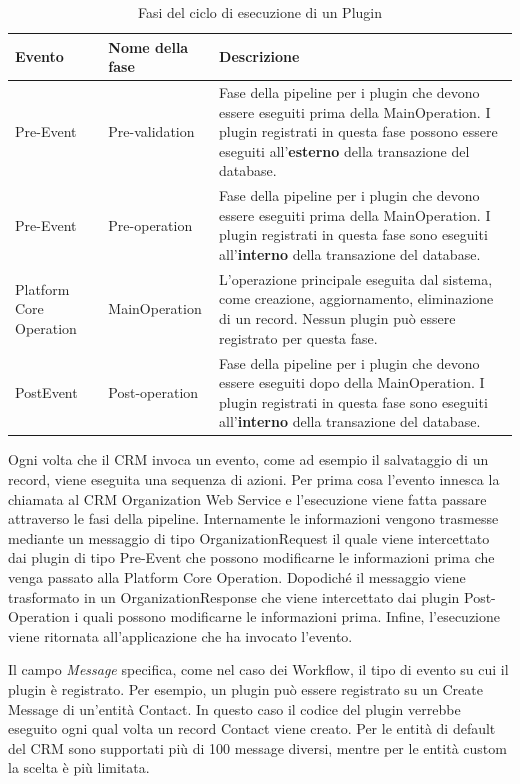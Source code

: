 \begin{table}[ht!]
  \centering
  \begin{tabular}{p{}lp{}}
    \toprule
      \textbf{Evento} & \textbf{Nome della fase} & \textbf{Descrizione} \\
    \midrule
      Pre-Event & Pre-validation &  Fase della pipeline per i plugin che devono essere eseguiti prima della MainOperation. I plugin registrati in questa fase possono essere eseguiti all'\textbf{esterno} della transazione del database. \\
    \midrule
      Pre-Event & Pre-operation & Fase della pipeline per i plugin che devono essere eseguiti prima della MainOperation. I plugin registrati in questa fase sono eseguiti all'\textbf{interno} della transazione del database. \\
    \midrule
      Platform Core Operation & MainOperation &  L'operazione principale eseguita dal sistema, come creazione, aggiornamento, eliminazione di un record. Nessun plugin può essere registrato per questa fase. \\
    \midrule
      PostEvent & Post-operation &  Fase della pipeline per i plugin che devono essere eseguiti dopo della MainOperation. I plugin registrati in questa fase sono eseguiti all'\textbf{interno} della transazione del database. \\
    \bottomrule
  \end{tabular}
  \caption{Fasi del ciclo di esecuzione di un Plugin}
  \label{table:pluginStages}
\end{table}

Ogni volta che il CRM invoca un evento, come ad esempio il salvataggio di un record, viene eseguita una sequenza di azioni.
Per prima cosa l'evento innesca la chiamata al CRM Organization Web Service e l'esecuzione viene fatta passare attraverso le fasi della pipeline. Internamente le informazioni vengono trasmesse mediante un messaggio di tipo OrganizationRequest il quale viene intercettato dai plugin di tipo Pre-Event che possono modificarne le informazioni prima che venga passato alla Platform Core Operation. Dopodiché il messaggio viene trasformato in un OrganizationResponse che viene intercettato dai plugin Post-Operation i quali possono modificarne le informazioni prima.
Infine, l'esecuzione viene ritornata all'applicazione che ha invocato l'evento.

Il campo \textit{Message} specifica, come nel caso dei Workflow, il tipo di evento su cui il plugin è registrato. Per esempio, un plugin può essere registrato su un Create Message di un'entità Contact. In questo caso il codice del plugin verrebbe eseguito ogni qual volta un record Contact viene creato. Per le entità di default del CRM sono supportati più di 100 message diversi, mentre per le entità custom la scelta è più limitata.

